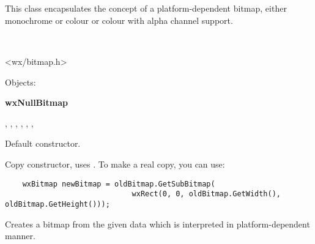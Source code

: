 \section{}\label{wxbitmap}

%
This class encapsulates the concept of a platform-dependent bitmap,
either monochrome or colour or colour with alpha channel support.


\\


<wx/bitmap.h>


Objects:

{\bf wxNullBitmap}


,
,
,
, , ,


\label{wxbitmapctor}


Default constructor.


Copy constructor, uses .
To make a real copy, you can use:

\begin{verbatim}
    wxBitmap newBitmap = oldBitmap.GetSubBitmap(
                             wxRect(0, 0, oldBitmap.GetWidth(), oldBitmap.GetHeight()));
\end{verbatim}


Creates a bitmap from the given data which is interpreted in platform-dependent
manner.


